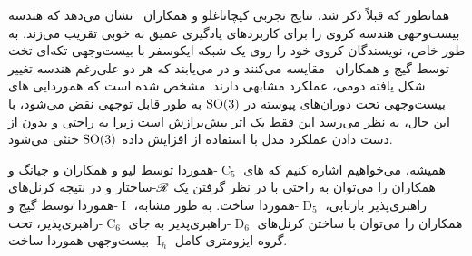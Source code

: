 همانطور که قبلاً ذکر شد، نتایج تجربی کیچاناغلو و همکاران~\cite{kicanaoglu2019gaugeSphere} نشان می‌دهد که هندسه بیست‌وجهی هندسه کروی را برای کاربردهای یادگیری عمیق به خوبی تقریب می‌زند.
به طور خاص، نویسندگان  کروی خود را روی یک شبکه ایکوسفر با  بیست‌وجهی تکه‌ای-تخت توسط گیج و همکاران~\cite{gaugeIco2019} مقایسه می‌کنند و در می‌یابند که هر دو علی‌رغم هندسه تغییر شکل یافته دومی، عملکرد مشابهی دارند.
مشخص شده است که هموردایی های بیست‌وجهی تحت دوران‌های پیوسته در $\operatorname{SO}(3)$ به طور قابل توجهی نقض می‌شود، با این حال، به نظر می‌رسد این فقط یک اثر بیش‌برازش است زیرا به راحتی و بدون از دست دادن عملکرد مدل با استفاده از افزایش داده $\operatorname{SO}(3)$ خنثی می‌شود.


همیشه، می‌خواهیم اشاره کنیم که های $\operatorname{C}_5$-هموردا توسط لیو و همکاران\cite{liu2018icoAltAz} و جیانگ و همکاران\cite{zhang2019orientation} را می‌توان به راحتی با در نظر گرفتن یک $\mathscr{R}$-ساختار و در نتیجه کرنل‌های راهبری‌پذیر بازتابی، $\operatorname{D}_5$-هموردا ساخت.
به طور مشابه،  $\operatorname{I}$-هموردا توسط گیج و همکاران\cite{gaugeIco2019} را می‌توان با ساختن کرنل‌های $\operatorname{D}_6$-راهبری‌پذیر به جای $\operatorname{C}_6$-راهبری‌پذیر، تحت گروه ایزومتری کامل $\operatorname{I}_h$ بیست‌وجهی هموردا ساخت.